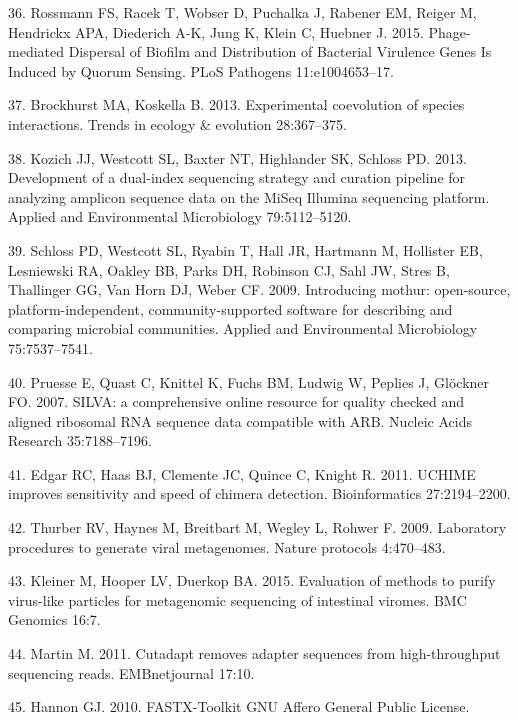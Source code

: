 \documentclass[12pt,]{article}
\begin{document}
\hypertarget{ref-Rossmann:2015cj}{}
36. Rossmann FS, Racek T, Wobser D, Puchalka J, Rabener EM, Reiger M,
Hendrickx APA, Diederich A-K, Jung K, Klein C, Huebner J. 2015.
Phage-mediated Dispersal of Biofilm and Distribution of Bacterial
Virulence Genes Is Induced by Quorum Sensing. PLoS Pathogens
11:e1004653--17.

\hypertarget{ref-Brockhurst:2013iq}{}
37. Brockhurst MA, Koskella B. 2013. Experimental coevolution of species
interactions. Trends in ecology \& evolution 28:367--375.

\hypertarget{ref-Kozich:2013db}{}
38. Kozich JJ, Westcott SL, Baxter NT, Highlander SK, Schloss PD. 2013.
Development of a dual-index sequencing strategy and curation pipeline
for analyzing amplicon sequence data on the MiSeq Illumina sequencing
platform. Applied and Environmental Microbiology 79:5112--5120.

\hypertarget{ref-Schloss:2009do}{}
39. Schloss PD, Westcott SL, Ryabin T, Hall JR, Hartmann M, Hollister
EB, Lesniewski RA, Oakley BB, Parks DH, Robinson CJ, Sahl JW, Stres B,
Thallinger GG, Van Horn DJ, Weber CF. 2009. Introducing mothur:
open-source, platform-independent, community-supported software for
describing and comparing microbial communities. Applied and
Environmental Microbiology 75:7537--7541.

\hypertarget{ref-Pruesse:2007jc}{}
40. Pruesse E, Quast C, Knittel K, Fuchs BM, Ludwig W, Peplies J,
Glöckner FO. 2007. SILVA: a comprehensive online resource for quality
checked and aligned ribosomal RNA sequence data compatible with ARB.
Nucleic Acids Research 35:7188--7196.

\hypertarget{ref-Edgar:2011gy}{}
41. Edgar RC, Haas BJ, Clemente JC, Quince C, Knight R. 2011. UCHIME
improves sensitivity and speed of chimera detection. Bioinformatics
27:2194--2200.

\hypertarget{ref-Thurber:2009dn}{}
42. Thurber RV, Haynes M, Breitbart M, Wegley L, Rohwer F. 2009.
Laboratory procedures to generate viral metagenomes. Nature protocols
4:470--483.

\hypertarget{ref-Kleiner:2015kd}{}
43. Kleiner M, Hooper LV, Duerkop BA. 2015. Evaluation of methods to
purify virus-like particles for metagenomic sequencing of intestinal
viromes. BMC Genomics 16:7.

\hypertarget{ref-Martin:2011eu}{}
44. Martin M. 2011. Cutadapt removes adapter sequences from
high-throughput sequencing reads. EMBnetjournal 17:10.

\hypertarget{ref-FASTXToolkit:wr}{}
45. Hannon GJ. 2010. FASTX-Toolkit GNU Affero General Public License.
\end{document}
